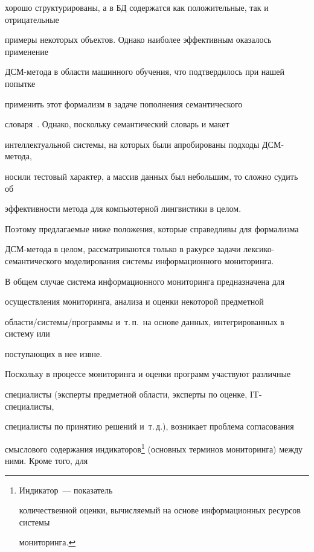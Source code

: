 хорошо структурированы, а в БД содержатся как положительные, так и отрицательные 


примеры некоторых объектов. Однако наиболее эффективным оказалось применение 


ДСМ-ме\-то\-да в области машинного обучения, что подтвердилось при нашей попытке 


применить этот формализм в задаче пополнения семантического 


   словаря~\cite{48-2-11}. Однако, поскольку семантический словарь и макет 


интеллектуальной системы, на которых были апробированы подходы ДСМ-метода, 


носили тестовый характер, а массив данных был небольшим, то сложно судить об 


эффективности метода для компьютерной лингвистики в целом.


   


   Поэтому предлагаемые ниже положения, которые справедливы для формализма 


   ДСМ-метода в целом, рассматриваются только в ракурсе задачи лексико-се\-ман\-ти\-че\-ского моделирования системы информационного мониторинга. 


   


   В общем случае система информационного мониторинга предназначена для 


осуществления мониторинга, анализа и оценки некоторой предметной 


об\-ласти/сис\-те\-мы/программы и~т.\,п.\ на основе данных, интегрированных в систему или 


поступающих в нее извне. 


   


   Поскольку в процессе мониторинга и оценки программ участвуют различные 


специалисты (эксперты предметной области, эксперты по оценке, IT-спе\-ци\-а\-листы, 


специалисты по принятию решений и~т.\,д.), возникает проблема согласования 


смыслового содержания индикаторов\footnote{{Индикатор}~--- показатель 


количественной оценки, вычисляемый на основе информационных ресурсов системы 


мониторинга.} (основных терминов мониторинга) между ними. Кроме того, для 


